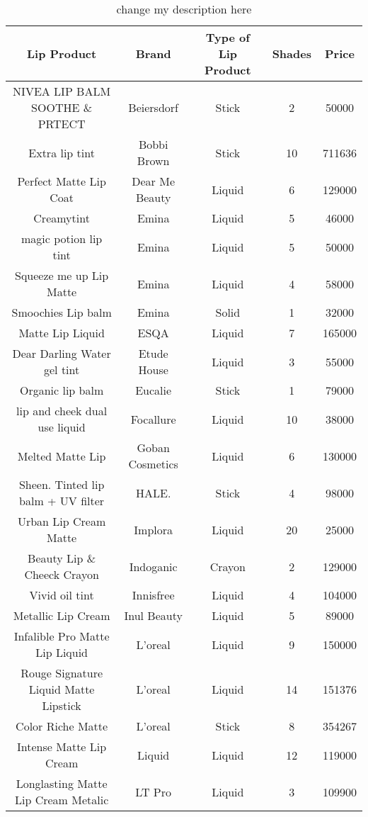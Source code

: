 
\begin{table}[htbp]
\centering
\caption{change my description here}
\label{tab:change label here}
\begin{tabular}{ccccc}        \hline
    \textbf{Lip Product} & \textbf{Brand} & \textbf{Type of Lip Product} & \textbf{Shades} & \textbf{Price} \\ \hline 
NIVEA LIP BALM SOOTHE \& PRTECT & Beiersdorf & Stick & 2 & 50000 \\ 
Extra lip tint & Bobbi Brown & Stick & 10 & 711636 \\ 
Perfect Matte Lip Coat & Dear Me Beauty & Liquid & 6 & 129000 \\ 
Creamytint & Emina & Liquid & 5 & 46000 \\ 
magic potion lip tint & Emina & Liquid & 5 & 50000 \\ 
Squeeze me up Lip Matte & Emina & Liquid & 4 & 58000 \\ 
Smoochies Lip balm & Emina & Solid & 1 & 32000 \\ 
Matte Lip Liquid & ESQA & Liquid & 7 & 165000 \\ 
Dear Darling Water gel tint & Etude House & Liquid & 3 & 55000 \\ 
Organic lip balm & Eucalie & Stick & 1 & 79000 \\ 
lip and cheek dual use liquid & Focallure & Liquid & 10 & 38000 \\ 
Melted Matte Lip & Goban Cosmetics & Liquid & 6 & 130000 \\ 
Sheen. Tinted lip balm + UV filter & HALE. & Stick & 4 & 98000 \\ 
Urban Lip Cream Matte & Implora & Liquid & 20 & 25000 \\ 
Beauty Lip \& Cheeck Crayon & Indoganic & Crayon & 2 & 129000 \\ 
Vivid oil tint & Innisfree & Liquid & 4 & 104000 \\ 
Metallic Lip Cream & Inul Beauty & Liquid & 5 & 89000 \\ 
Infalible Pro Matte Lip Liquid & L'oreal & Liquid & 9 & 150000 \\ 
Rouge Signature Liquid Matte Lipstick & L'oreal & Liquid & 14 & 151376 \\ 
Color Riche Matte & L'oreal & Stick & 8 & 354267 \\ 
Intense Matte Lip Cream & Liquid & Liquid & 12 & 119000 \\ 
Longlasting Matte Lip Cream Metalic & LT Pro & Liquid & 3 & 109900 \\ 

\end{tabular}
\end{table}
